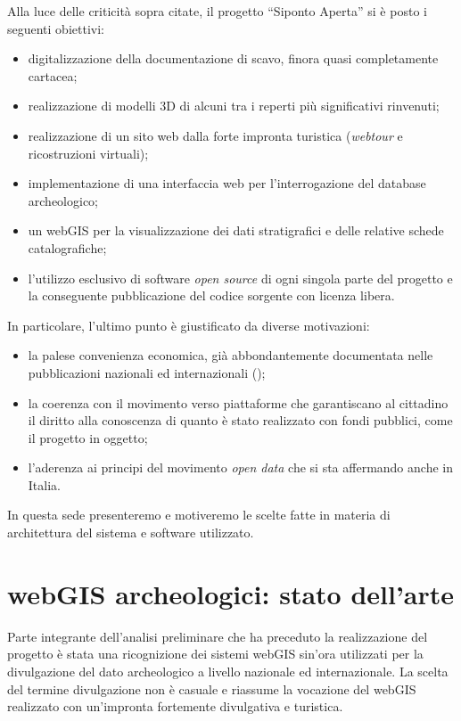 \documentclass{paper}
\begin{document}
        Alla luce delle criticità sopra citate, il progetto ``Siponto Aperta'' si è posto i seguenti obiettivi:

        \begin{itemize}
            \item digitalizzazione della documentazione di scavo, finora quasi completamente cartacea;
            \item realizzazione di modelli 3D di alcuni tra i reperti più significativi rinvenuti;
            \item realizzazione di un sito web dalla forte impronta turistica (\textit{webtour} e ricostruzioni virtuali);
            \item implementazione di una interfaccia web per l'interrogazione del database archeologico;
            \item un webGIS per la visualizzazione dei dati stratigrafici e delle relative schede catalografiche;
            \item l'utilizzo esclusivo di software \textit{open source} di ogni singola parte del progetto e la conseguente pubblicazione del codice sorgente con licenza libera.
        \end{itemize}

        \noindent In particolare, l'ultimo punto è giustificato da diverse motivazioni:

        \begin{itemize}
            \item la palese convenienza economica, già abbondantemente documentata nelle pubblicazioni nazionali ed internazionali (\cite{open-source-archeologia});
            \item la coerenza con il movimento verso piattaforme che garantiscano al cittadino il diritto alla conoscenza di quanto è stato realizzato con fondi pubblici, come il progetto in oggetto;
            \item l'aderenza ai principi del movimento \emph{open data} che si sta affermando anche in Italia.
        \end{itemize}

        In questa sede presenteremo e motiveremo le scelte fatte in materia di architettura del sistema e software utilizzato.

\section{webGIS archeologici: stato dell'arte}

    Parte integrante dell'analisi preliminare che ha preceduto la realizzazione del progetto è stata una ricognizione dei sistemi webGIS sin'ora utilizzati per la divulgazione del dato archeologico a livello nazionale ed internazionale. La scelta del termine divulgazione non è casuale e riassume la vocazione del webGIS realizzato con un'impronta fortemente divulgativa e turistica.
\end{document}
